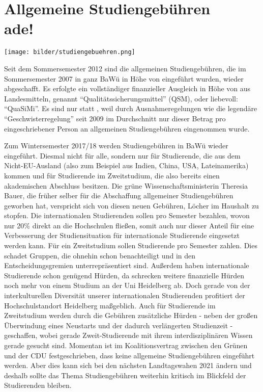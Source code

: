 \section[Allgemeine Studiengebühren ade]{Allgemeine Studiengebühren \\ade!}

\begin{figure*}[t]
\centering
\texttt{[image: bilder/studiengebuehren.png]}
\end{figure*}

Seit dem Sommersemester 2012 sind die allgemeinen Studiengebühren, die im Sommersemester 2007 in ganz BaWü in Höhe von  eingeführt wurden, wieder abgeschafft. Es erfolgte ein vollständiger finanzieller Ausgleich in Höhe von  aus Landesmitteln, genannt “Qualitätssicherungsmittel” (QSM), oder liebevoll: “QuaSiMi”. Es sind nur  statt , weil durch Ausnahmeregelungen wie die legendäre “Geschwisterregelung” seit 2009 im Durchschnitt nur dieser Betrag pro eingeschriebener Person an allgemeinen Studiengebühren eingenommen wurde.

Zum Wintersemester 2017/18 werden Studiengebühren in BaWü wieder eingeführt. Diesmal nicht für alle, sondern nur für Studierende, die aus dem Nicht-EU-Ausland (also zum Beispiel aus Indien, China, USA, Lateinamerika) kommen und für Studierende im Zweitstudium, die also bereits einen akademischen Abschluss besitzen. Die grüne Wissenschaftsministerin Theresia Bauer, die früher selber für die Abschaffung allgemeiner Studiengebühren geworben hat, verspricht sich von diesen neuen Gebühren, Löcher im Haushalt zu stopfen. Die internationalen Studierenden sollen  pro Semester bezahlen, wovon nur 20\% direkt an die Hochschulen fließen, somit auch nur dieser Anteil für eine Verbesserung der Studiensituation für internationale Studierende eingesetzt werden kann. Für ein Zweitstudium sollen Studierende  pro Semester zahlen. Dies schadet Gruppen, die ohnehin schon benachteiligt und in den Entscheidungsgremien unterrepräsentiert sind. Außerdem haben internationale Studierende schon genügend Hürden, da schrecken weitere finanzielle Hürden noch mehr von einem Studium an der Uni Heidelberg ab. Doch gerade von der interkulturellen Diversität unserer internationalen Studierenden profitiert der Hochschulstandort Heidelberg maßgeblich. Auch für Studierende im Zweitstudium werden durch die Gebühren zusätzliche Hürden - neben der großen Überwindung eines Neustarts und der dadurch verlängerten Studienzeit - geschaffen, wobei gerade Zweit-Studierende mit ihrem interdisziplinären Wissen gerade gesucht sind. Momentan ist im Koalitionsvertrag zwischen den Grünen und der CDU festgeschrieben, dass keine allgemeine Studiengebühren eingeführt werden. Aber dies kann sich bei den nächsten Landtagswahen 2021 ändern und deshalb sollte das Thema Studiengebühren weiterhin kritisch im Blickfeld der Studierenden bleiben.

